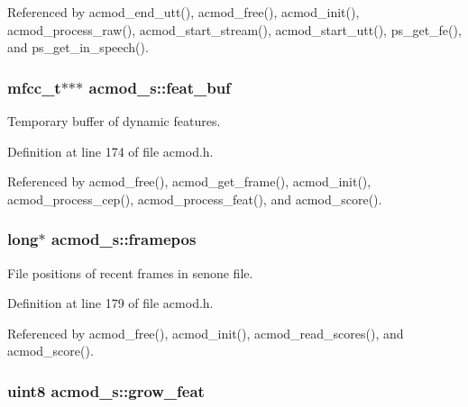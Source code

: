 Referenced by acmod\-\_\-end\-\_\-utt(), acmod\-\_\-free(), acmod\-\_\-init(), acmod\-\_\-process\-\_\-raw(), acmod\-\_\-start\-\_\-stream(), acmod\-\_\-start\-\_\-utt(), ps\-\_\-get\-\_\-fe(), and ps\-\_\-get\-\_\-in\-\_\-speech().

\subsubsection[{feat\-\_\-buf}]{\setlength{\rightskip}{0pt plus 5cm}mfcc\-\_\-t$\ast$$\ast$$\ast$ acmod\-\_\-s\-::feat\-\_\-buf}\label{structacmod__s_afc52cc0151f6c7e32a230576141d20a3}


Temporary buffer of dynamic features. 



Definition at line 174 of file acmod.\-h.



Referenced by acmod\-\_\-free(), acmod\-\_\-get\-\_\-frame(), acmod\-\_\-init(), acmod\-\_\-process\-\_\-cep(), acmod\-\_\-process\-\_\-feat(), and acmod\-\_\-score().

\subsubsection[{framepos}]{\setlength{\rightskip}{0pt plus 5cm}long$\ast$ acmod\-\_\-s\-::framepos}\label{structacmod__s_abfd364dafee513f523e1566bb706e48b}


File positions of recent frames in senone file. 



Definition at line 179 of file acmod.\-h.



Referenced by acmod\-\_\-free(), acmod\-\_\-init(), acmod\-\_\-read\-\_\-scores(), and acmod\-\_\-score().

\subsubsection[{grow\-\_\-feat}]{\setlength{\rightskip}{0pt plus 5cm}uint8 acmod\-\_\-s\-::grow\-\_\-feat}\label{structacmod__s_acbb3fed9495e7b80da79cb03ff3079a1}


